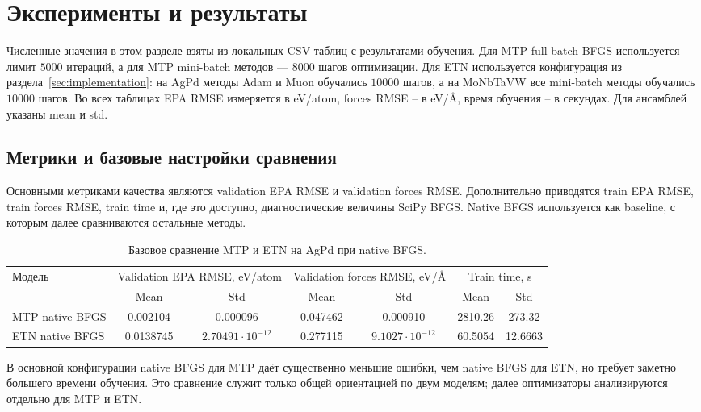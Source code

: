 \section{Эксперименты и результаты}
\label{sec:experiments}

Численные значения в этом разделе взяты из локальных CSV-таблиц с результатами обучения. Для MTP full-batch BFGS используется лимит \(5000\) итераций, а для MTP mini-batch методов --- \(8000\) шагов оптимизации. Для ETN используется конфигурация из раздела~\ref{sec:implementation}: на AgPd методы Adam и Muon обучались \(10000\) шагов, а на MoNbTaVW все mini-batch методы обучались \(10000\) шагов. Во всех таблицах EPA RMSE измеряется в eV/atom, forces RMSE -- в eV/\AA, время обучения -- в секундах. Для ансамблей указаны mean и std.

\subsection{Метрики и базовые настройки сравнения}

Основными метриками качества являются validation EPA RMSE и validation forces RMSE. Дополнительно приводятся train EPA RMSE, train forces RMSE, train time и, где это доступно, диагностические величины SciPy BFGS. Native BFGS используется как baseline, с которым далее сравниваются остальные методы.

\begin{table}[H]
\centering
\small
\caption{Базовое сравнение MTP и ETN на AgPd при native BFGS.}
\label{tab:task1-mtp-etn}
\begingroup
\setlength{\tabcolsep}{3pt}
\begin{tabular}{@{}lcccccc@{}}
\toprule
Модель & \multicolumn{2}{c}{Validation EPA RMSE, eV/atom} & \multicolumn{2}{c}{Validation forces RMSE, eV/\AA} & \multicolumn{2}{c}{Train time, s} \\
\cmidrule(lr){2-3}\cmidrule(lr){4-5}\cmidrule(lr){6-7}
 & Mean & Std & Mean & Std & Mean & Std \\
\midrule
MTP native BFGS & 0.002104 & 0.000096 & 0.047462 & 0.000910 & 2810.26 & 273.32 \\
ETN native BFGS & 0.0138745 & \(2.70491\cdot 10^{-12}\) & 0.277115 & \(9.1027\cdot 10^{-12}\) & 60.5054 & 12.6663 \\
\bottomrule
\end{tabular}
\endgroup
\end{table}

В основной конфигурации native BFGS для MTP даёт существенно меньшие ошибки, чем native BFGS для ETN, но требует заметно большего времени обучения. Это сравнение служит только общей ориентацией по двум моделям; далее оптимизаторы анализируются отдельно для MTP и ETN.

